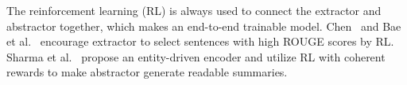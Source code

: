 The reinforcement learning (RL) is always used to connect the extractor and abstractor together,
which makes an end-to-end trainable model.
Chen~ and Bae et al.~ encourage extractor
to select sentences with high ROUGE scores by RL. 
Sharma et al.~ propose an entity-driven encoder and
utilize RL with coherent rewards to make abstractor generate readable summaries. 




 
